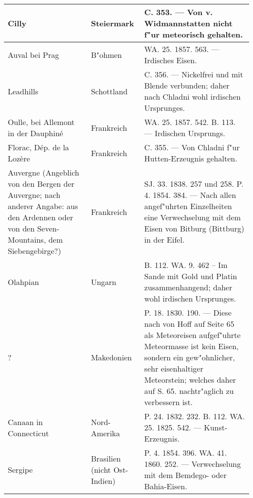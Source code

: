\documentclass[a4paper, 8pt, oneside, polutonikogreek, german]{article}
\begin{document}
\begin{table}[H]
\begin{longtable}{|p{40mm}|p{20mm}|p{60mm}|}
        Cilly & Steiermark & C. 353. --- Von v. Widmannstatten nicht f"ur meteorisch gehalten. \\ \hline
        Auval bei Prag & B"ohmen & WA. 25. 1857. 563. --- Irdisches Eisen. \\ \hline
        Leadhills & Schottland & C. 356. --- Nickelfrei und mit Blende verbunden; daher nach Chladni wohl irdischen Ursprunges. \\ \hline
        Oulle, bei Allemont in der Dauphiné & Frankreich & WA. 25. 1857. 542. B. 113. --- Irdischen Ursprungs. \\ \hline
        Florac, Dép. de la Lozère & Frankreich & C. 355. --- Von Chladni f"ur Hutten-Erzeugnis gehalten. \\ \hline
        Auvergne (Angeblich von den Bergen der Auvergne; nach anderer Angabe: aus den Ardennen oder von den Seven-Mountains, dem Siebengebirge?) & Frankreich & SJ. 33. 1838. 257 und 258. P. 4. 1854. 384. --- Nach allen angef"uhrten Einzelheiten eine Verwechselung mit dem Eisen von Bitburg (Bittburg) in der Eifel. \\ \hline
        Olahpian & Ungarn & B. 112. WA. 9. 462 – Im Sande mit Gold und Platin zusammenhangend; daher wohl irdischen Ursprunges. \\ \hline
        ? & Makedonien & P. 18. 1830. 190. --- Diese nach von Hoff auf Seite 65 als Meteoreisen aufgef"uhrte Meteormasse ist kein Eisen, sondern ein gew"ohnlicher, sehr eisenhaltiger Meteorstein; welches daher auf S. 65. nachtr"aglich zu verbessern ist. \\ \hline
        Canaan in Connecticut & Nord-Amerika & P. 24. 1832. 232. B. 112. WA. 25. 1825. 542. --- Kunst-Erzeugnis. \\ \hline
        Sergipe & Brasilien (nicht Ost-Indien) & P. 4. 1854. 396. WA. 41. 1860. 252. --- Verwechselung mit dem Bemdego- oder Bahia-Eisen. \\ \hline
    \end{longtable}
\end{table}
\clearpage
\end{document}
